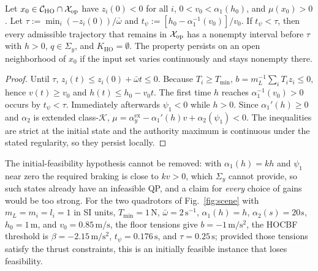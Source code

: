 \begin{theorem}\label{thm:negative}
Let $x_0\in\mathcal{C}_{\mathrm{HO}}\cap\mathcal{X}_{\mathrm{op}}$ have $z_i(0)<0$ for all $i$, $0<v_0<\alpha_1(h_0)$, and $\mu(x_0)>0$. Let
$\tau:=\min_i(-z_i(0))/\bar\omega$ and $t_\psi:=[h_0-\alpha_1^{-1}(v_0)]/v_0$. If $t_\psi<\tau$, then every admissible trajectory that remains in $\mathcal{X}_{\mathrm{op}}$ has a nonempty interval before $\tau$ with $h>0$, $q\in\Sigma_y$, and $K_{\mathrm{HO}}=\emptyset$. The property persists on an open neighborhood of $x_0$ if the input set varies continuously and stays nonempty there.
\end{theorem}
\begin{proof}
Until $\tau$, $z_i(t)\le z_i(0)+\bar\omega t\le0$. Because $T_i\ge T_{\min}$, $b=m_L^{-1}\sum_iT_iz_i\le0$, hence $v(t)\ge v_0$ and $h(t)\le h_0-v_0t$. The first time $h$ reaches $\alpha_1^{-1}(v_0)>0$ occurs by $t_\psi<\tau$. Immediately afterwards $\psi_1<0$ while $h>0$. Since $\alpha_1'(h)\ge0$ and $\alpha_2$ is extended class-$\mathcal K$, $\mu=\alpha_y^{\mathrm{ex}}-\alpha_1'(h)v+\alpha_2(\psi_1)<0$. The inequalities are strict at the initial state and the authority maximum is continuous under the stated regularity, so they persist locally.
\end{proof}

The initial-feasibility hypothesis cannot be removed: with $\alpha_1(h)=kh$ and $\psi_1$ near zero the required braking is close to $kv>0$, which $\Sigma_y$ cannot provide, so such states already have an infeasible QP, and a claim for \emph{every} choice of gains would be too strong. For the two quadrotors of Fig.~\ref{fig:scene} with $m_L=m_i=l_i=1$ in SI units, $T_{\min}=1\,\mathrm N$, $\bar\omega=2\,\mathrm{s^{-1}}$, $\alpha_1(h)=h$, $\alpha_2(s)=20s$, $h_0=1\,\mathrm m$, and $v_0=0.85\,\mathrm{m/s}$, the floor tensions give $b=-1\,\mathrm{m/s^2}$, the HOCBF threshold is $\beta=-2.15\,\mathrm{m/s^2}$, $t_\psi=0.176\,\mathrm s$, and $\tau=0.25\,\mathrm s$; provided those tensions satisfy the thrust constraints, this is an initially feasible instance that loses feasibility.
